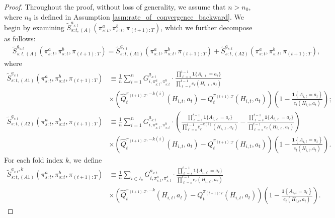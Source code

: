 \begin{proof}
Throughout the proof, without loss of generality, we assume that $n>n_0$, where $n_0$ is defined in Assumption \ref{asm:rate_of_convergence_backward}.
We begin by examining $\widetilde{S}_{s:t,(A)}^{\underline{a}_{s:t}}(\pi_{s:t}^{a},\pi_{s:t}^{b},\pi_{(t+1):T})$, which we further decompose as follows:
\begin{align*}
    &\widetilde{S}_{s:t,(A)}^{\underline{a}_{s:t}}(\pi_{s:t}^{a},\pi_{s:t}^{b},\pi_{(t+1):T}) = \widetilde{S}_{s:t,(A1)}^{\underline{a}_{s:t}}(\pi_{s:t}^{a},\pi_{s:t}^{b},\pi_{(t+1):T}) + \widetilde{S}_{s:t,(A2)}^{\underline{a}_{s:t}}(\pi_{s:t}^{a},\pi_{s:t}^{b},\pi_{(t+1):T}),
\end{align*}
where
\begin{align*}
\widetilde{S}_{s:t,(A1)}^{\underline{a}_{s:t}}(\pi_{s:t}^{a},\pi_{s:t}^{b},\pi_{(t+1):T})& \equiv \frac{1}{n}\sum_{i=1}^{n}G_{i,\pi_{s:t}^{a},\pi_{s:t}^{b}}^{\underline{a}_{s:t}}\cdot\frac{\prod_{\ell=s}^{t-1}\mathbf{1}\{A_{i,\ell}=a_{\ell}\}}{\prod_{\ell=s}^{t-1}e_{\ell}(H_{i,\ell},a_{\ell})}\\
      &\times\left(\widehat{Q}_{t}^{\pi_{(t+1):T},-k(i)}\left(H_{i,t},a_{t}\right)-Q_{t}^{\pi_{(t+1):T}}\left(H_{i,t},a_{t}\right)\right)\left(1-\frac{\mathbf{1}\left\{ A_{i,t}=a_{t}\right\} }{e_{t}\left(H_{i,t},a_{t}\right)}\right);\\
\widetilde{S}_{s:t,(A2)}^{\underline{a}_{s:t}}(\pi_{s:t}^{a},\pi_{s:t}^{b},\pi_{(t+1):T})& \equiv \frac{1}{n}\sum_{i=1}^{n}G_{i,\pi_{s:t}^{a},\pi_{s:t}^{b}}^{\underline{a}_{s:t}}\cdot\left(\frac{\prod_{\ell=s}^{t-1}\mathbf{1}\{A_{i,\ell}=a_{\ell}\}}{\prod_{\ell=s}^{t-1}\hat{e}_{\ell}^{-k(i)}(H_{i,\ell},a_{\ell})}-\frac{\prod_{\ell=s}^{t-1}\mathbf{1}\{A_{i,\ell}=a_{\ell}\}}{\prod_{\ell=s}^{t-1}e_{\ell}(H_{i,\ell},a_{\ell})}\right)\\
 &\times\left(\widehat{Q}_{t}^{\pi_{(t+1):T},-k(i)}\left(H_{i,t},a_{t}\right)-Q_{t}^{\pi_{(t+1):T}}\left(H_{i,t},a_{t}\right)\right)\left(1-\frac{\mathbf{1}\left\{ A_{i,t}=a_{t}\right\} }{e_{t}\left(H_{i,t},a_{t}\right)}\right).
\end{align*}
For each fold index $k$, we define
\begin{align*}
\widetilde{S}_{s:t,(A1)}^{\underline{a}_{s:t},k}(\pi_{s:t}^{a},\pi_{s:t}^{b},\pi_{(t+1):T})& \equiv \frac{1}{n}\sum_{i \in I_{k}}G_{i,\pi_{s:t}^{a},\pi_{s:t}^{b}}^{\underline{a}_{s:t}}\cdot\frac{\prod_{\ell=s}^{t-1}\mathbf{1}\{A_{i,\ell}=a_{\ell}\}}{\prod_{\ell=s}^{t-1}e_{\ell}(H_{i,\ell},a_{\ell})}\\
      &\times\left(\widehat{Q}_{t}^{\pi_{(t+1):T},-k}\left(H_{i,t},a_{t}\right)-Q_{t}^{\pi_{(t+1):T}}\left(H_{i,t},a_{t}\right)\right)\left(1-\frac{\mathbf{1}\left\{ A_{i,t}=a_{t}\right\} }{e_{t}\left(H_{i,t},a_{t}\right)}\right).
\end{align*}




\end{proof}
